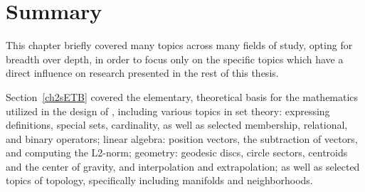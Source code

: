 %
%

%
%
%
%
%
%
\section{Summary}
This chapter briefly covered many topics across many fields of study, opting for breadth over depth, in order to focus only on the specific topics which have a direct influence on research presented in the rest of this thesis.

Section~\ref{ch2sETB} covered the elementary, theoretical basis for the mathematics utilized in the design of , including various topics in set theory: expressing definitions, special sets, cardinality, as well as selected membership, relational, and binary operators; linear algebra: position vectors, the subtraction of vectors, and computing the L2-norm; geometry: geodesic discs, circle sectors, centroids and the center of gravity, and interpolation and extrapolation; as well as selected topics of topology, specifically including manifolds and neighborhoods.

